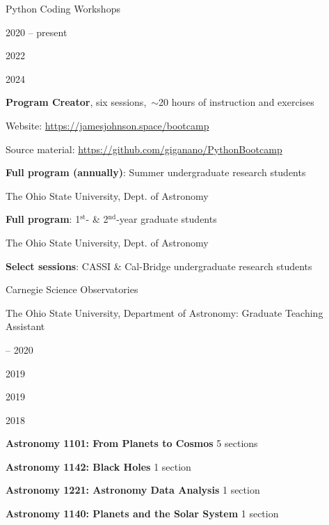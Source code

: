 \documentclass[cv.tex]{subfiles}
\begin{document}
{\color{themecolor} \large Python Coding Workshops}
\par\noindent
\parbox{0.18\textwidth}{%
	\vspace{2mm}
	\raggedleft
	\null \par
	\null \par
	\null \par
	2020 -- present \par
	\null \par
	2022 \par
	\null \par
	2024 \par
	\null
}
\hspace{1mm}
\parbox{0.73\textwidth}{%
	\textbf{Program Creator}, six sessions,~$\sim$20 hours of instruction
	and exercises \par
	Website: {\small \url{https://jamesjohnson.space/bootcamp}} \par
	Source material:
	{\small \url{https://github.com/giganano/PythonBootcamp}} \par
	\textbf{Full program (annually)}: Summer undergraduate research students \par
	The Ohio State University, Dept. of Astronomy \par
	\textbf{Full program}: 1$^\text{st}$- \& 2$^\text{nd}$-year graduate
	students \par
	The Ohio State University, Dept. of Astronomy \par
	\textbf{Select sessions}: CASSI \& Cal-Bridge undergraduate research
	students \par
	Carnegie Science Observatories
}

\vspace{4mm}
\noindent
{\color{themecolor} \large The Ohio State University, Department of Astronomy:
Graduate Teaching Assistant}
\par\noindent
\parbox{0.18\textwidth}{%
	 -- 2020 \par
	2019 \par
	2019 \par
	2018
}
\hspace{1mm}
\parbox{0.8\textwidth}{%
	\vspace{1mm}
	\textbf{Astronomy 1101: From Planets to Cosmos} \hfill 5 sections \par
	\textbf{Astronomy 1142: Black Holes} \hfill 1 section \par
	\textbf{Astronomy 1221: Astronomy Data Analysis} \hfill 1 section \par
	\textbf{Astronomy 1140: Planets and the Solar System} \hfill 1 section \par
}
\end{document}
